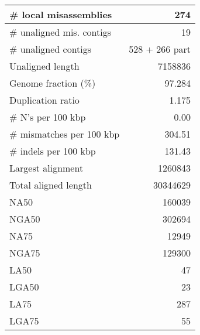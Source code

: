 \documentclass[12pt,a4paper]{article}
\begin{document}
\begin{table}[ht]
\begin{center}
\begin{tabular}{|l*{1}{|r}|}
\# local misassemblies & 274 \\ \hline
\# unaligned mis. contigs & 19 \\ \hline
\# unaligned contigs & 528 + 266 part \\ \hline
Unaligned length & 7158836 \\ \hline
Genome fraction (\%) & 97.284 \\ \hline
Duplication ratio & 1.175 \\ \hline
\# N's per 100 kbp & 0.00 \\ \hline
\# mismatches per 100 kbp & 304.51 \\ \hline
\# indels per 100 kbp & 131.43 \\ \hline
Largest alignment & 1260843 \\ \hline
Total aligned length & 30344629 \\ \hline
NA50 & 160039 \\ \hline
NGA50 & 302694 \\ \hline
NA75 & 12949 \\ \hline
NGA75 & 129300 \\ \hline
LA50 & 47 \\ \hline
LGA50 & 23 \\ \hline
LA75 & 287 \\ \hline
LGA75 & 55 \\ \hline
\end{tabular}
\end{center}
\end{table}
\end{document}
